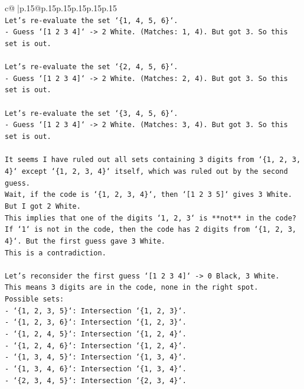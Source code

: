 \documentclass{article}
\begin{document}
{\begin{supertabular}{c@{$\;$}|p{.15\linewidth}@{}p{.15\linewidth}p{.15\linewidth}p{.15\linewidth}p{.15\linewidth}p{.15\linewidth}}
{{{\\ 
\texttt{Let's re{-}evaluate the set `\{1, 4, 5, 6\}`.} \\
\texttt{{-} Guess `{[}1 2 3 4{]}` {-}> 2 White. (Matches: 1, 4). But got 3. So this set is out.} \\
\\ 
\texttt{Let's re{-}evaluate the set `\{2, 4, 5, 6\}`.} \\
\texttt{{-} Guess `{[}1 2 3 4{]}` {-}> 2 White. (Matches: 2, 4). But got 3. So this set is out.} \\
\\ 
\texttt{Let's re{-}evaluate the set `\{3, 4, 5, 6\}`.} \\
\texttt{{-} Guess `{[}1 2 3 4{]}` {-}> 2 White. (Matches: 3, 4). But got 3. So this set is out.} \\
\\ 
\texttt{It seems I have ruled out all sets containing 3 digits from `\{1, 2, 3, 4\}` except `\{1, 2, 3, 4\}` itself, which was ruled out by the second guess.} \\
\texttt{Wait, if the code is `\{1, 2, 3, 4\}`, then `{[}1 2 3 5{]}` gives 3 White. But I got 2 White.} \\
\texttt{This implies that one of the digits `1, 2, 3` is **not** in the code?} \\
\texttt{If `1` is not in the code, then the code has 2 digits from `\{1, 2, 3, 4\}`. But the first guess gave 3 White.} \\
\texttt{This is a contradiction.} \\
\\ 
\texttt{Let's reconsider the first guess `{[}1 2 3 4{]}` {-}> 0 Black, 3 White.} \\
\texttt{This means 3 digits are in the code, none in the right spot.} \\
\texttt{Possible sets:} \\
\texttt{{-} `\{1, 2, 3, 5\}`: Intersection `\{1, 2, 3\}`.} \\
\texttt{{-} `\{1, 2, 3, 6\}`: Intersection `\{1, 2, 3\}`.} \\
\texttt{{-} `\{1, 2, 4, 5\}`: Intersection `\{1, 2, 4\}`.} \\
\texttt{{-} `\{1, 2, 4, 6\}`: Intersection `\{1, 2, 4\}`.} \\
\texttt{{-} `\{1, 3, 4, 5\}`: Intersection `\{1, 3, 4\}`.} \\
\texttt{{-} `\{1, 3, 4, 6\}`: Intersection `\{1, 3, 4\}`.} \\
\texttt{{-} `\{2, 3, 4, 5\}`: Intersection `\{2, 3, 4\}`.} \\
}}}
\end{supertabular}}
\end{document}
